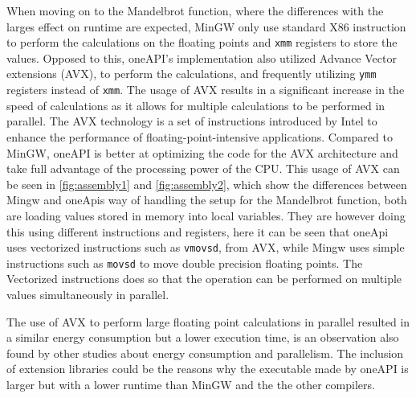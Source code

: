 When moving on to the Mandelbrot function, where the differences with the larges effect on runtime are expected, MinGW only use standard X86 instruction\cite{X86} to perform the calculations on the floating points and \texttt{xmm} registers to store the values. Opposed to this, oneAPI's implementation also utilized Advance Vector extensions (AVX)\cite{AVXIntel}, to perform the calculations, and frequently utilizing \texttt{ymm} registers instead of \texttt{xmm}. The usage of AVX results in a significant increase in the speed of calculations as it allows for multiple calculations to be performed in parallel. The AVX technology is a set of instructions introduced by Intel to enhance the performance of floating-point-intensive applications\cite{AVXIntel}. Compared to MinGW, oneAPI is better at optimizing the code for the AVX architecture and take full advantage of the processing power of the CPU. This usage of AVX can be seen in \cref{fig:assembly1} and \cref{fig:assembly2}, which show the differences between Mingw and oneApis way of handling the setup for the Mandelbrot function, both are loading values stored in memory into local variables. They are however doing this using different instructions and registers, here it can be seen that oneApi uses vectorized instructions such as \texttt{vmovsd}, from AVX, while Mingw uses simple instructions such as \texttt{movsd} to move double precision floating points. The Vectorized instructions does so that the operation can be performed on multiple values simultaneously in parallel.

The use of AVX to perform large floating point calculations in parallel resulted in a similar energy consumption but a lower execution time, is an observation also found by other studies about energy consumption and parallelism\cite{Lindholt2022}.
The inclusion of extension libraries could be the reasons why the executable made by oneAPI is larger but with a lower runtime than MinGW and the the other compilers.







